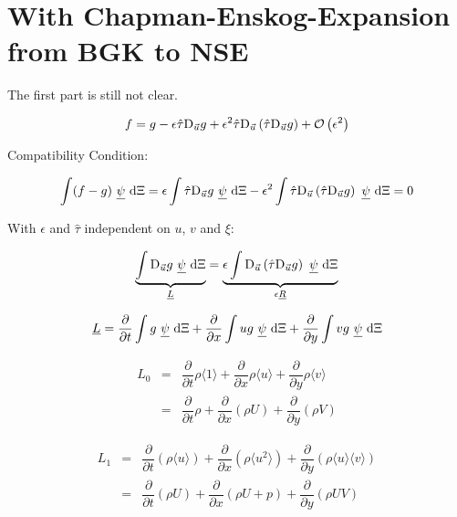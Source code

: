 \documentclass[
	pdftex,             %
	12pt,				%
	a4paper,		   	%
	english,				%
	oneside,			%
]{article}
\newcommand{\mom}[1]{\langle #1 \rangle}
\newcommand{\uu}[1]{\underline{#1}}
\newcommand{\vv}[1]{\vec{#1}}
\newcommand{\pdxi}{~\uu{\psi}~\textnormal{d}\Xi}
\newcommand{\pp}[1]{\dfrac{\partial}{\partial #1}}
\newcommand{\ppt}{\pp{t}}
\newcommand{\ppx}{\pp{x}}
\newcommand{\ppy}{\pp{y}}
\begin{document}
\section{With Chapman-Enskog-Expansion from BGK to NSE}

The first part is still not clear.

\begin{equation}
f = g - \epsilon \hat{\tau} \textnormal{D}_{\vv{u}} g 
      + \epsilon^2 \hat{\tau} \textnormal{D}_{\vv{u}} \left( \hat{\tau} \textnormal{D}_{\vv{u}} g \right) 
      + \mathcal{O} \left( \epsilon^2 \right)
\end{equation}

Compatibility Condition:

\begin{equation}
\int (f-g) \pdxi
=
\epsilon \int \hat{\tau} \textnormal{D}_{\vv{u}} g \pdxi
-
\epsilon^2 \int \hat{\tau} \textnormal{D}_{\vv{u}} \left( \hat{\tau} \textnormal{D}_{\vv{u}} g \right) \pdxi
= 0
\end{equation}

With $\epsilon$ and $\hat{\tau}$ independent on $u$, $v$ and $\xi$:

\begin{equation}
\underbrace{
    \int \textnormal{D}_{\vv{u}} g \pdxi
}_{\uu{L}}
=
\underbrace{
    \epsilon \int \textnormal{D}_{\vv{u}} \left( \hat{\tau} \textnormal{D}_{\vv{u}} g \right) \pdxi
}_{\epsilon \uu{R}}
\end{equation}

\begin{equation}
\uu{L} = \ppt \int g \pdxi + \ppx \int u g \pdxi + \ppy \int v g \pdxi
\end{equation}

\begin{equation}
\begin{array}{lcl}
L_0 &=& \ppt \rho \mom{1} + \ppx \rho \mom{u} + \ppy \rho \mom{v} \\
    &=& \ppt \rho + \ppx \left( \rho U \right) + \ppy \left( \rho V \right)
\end{array}
\end{equation}

\begin{equation}
\begin{array}{lcl}
L_1 &=& \ppt \left( \rho \mom{u} \right)
      + \ppx \left( \rho \mom{u^2} \right)
      + \ppy \left( \rho \mom{u} \mom{v} \right) \\
    &=& \ppt \left( \rho U \right)
      + \ppx \left( \rho U + p \right)
      + \ppy \left( \rho U V \right)
\end{array}
\end{equation}
\end{document}
